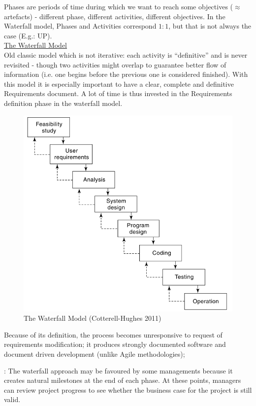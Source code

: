 Phases are periods of time during which we want to reach some objectives ($\approx$ artefacts) - different phase, different activities, different objectives. In the Waterfall model, Phases and Activities correspond $1:1$, but that is not always the case (E.g.: UP).\\
\noindent \underline{The Waterfall Model}\\
Old classic model which is not iterative: each activity is ``definitive'' and is never revisited - though two activities might overlap to guarantee better flow of information (i.e. one begins before the previous one is considered finished). With this model it is especially important to have a clear, complete and definitive Requirements document. A lot of time is thus invested in the Requirements definition phase in the waterfall model.
\begin{figure} [H]
    \centering
    \includegraphics[scale=0.4]{Figures/01/waterfall00.png}
    \caption{The Waterfall Model (Cotterell-Hughes 2011)}
    \label{fig:wf1}
\end{figure}

Because of its definition, the process becomes unresponsive to request of requirements modification; it produces strongly documented software and document driven development (unlike Agile methodologies);

: The waterfall approach may be favoured by some managements because it creates natural milestones at the end of each phase. At these points, managers can review project progress to see whether the business case for the project is still valid.

